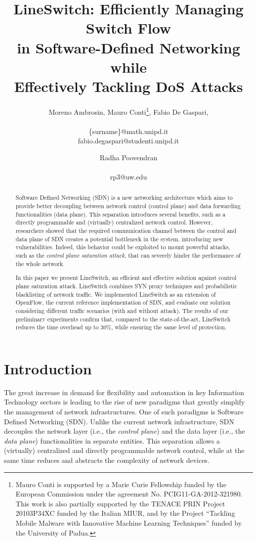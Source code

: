 \documentclass{sig-alternate}
\author{
	Moreno Ambrosin, Mauro Conti\thanks{\scriptsize Mauro Conti is supported by a Marie Curie Fellowship funded by the European Commission under the agreement No. PCIG11-GA-2012-321980. This work is also partially supported by the TENACE PRIN Project 20103P34XC funded by the Italian MIUR, and by the Project ``Tackling Mobile Malware with Innovative Machine Learning Techniques'' funded by the University of Padua.}, Fabio De Gaspari,\\
	\affaddr{University of Padua, Italy}\\
	{\{surname\}@math.unipd.it}\\
	{fabio.degaspari@studenti.unipd.it}
	\and
	Radha Poovendran\\
	\affaddr{University of Washington, USA}\\
	{rp3@uw.edu}	
}
\begin{document}
\title{LineSwitch: Efficiently Managing Switch Flow \\in Software-Defined Networking while \\Effectively Tackling DoS Attacks}


\maketitle


\begin{abstract}

Software Defined Networking (SDN) is a new networking architecture which aims to provide better decoupling between network control (control plane) 
and data forwarding functionalities (data plane). 
This separation introduces several benefits, such as a directly programmable and (virtually) centralized network control. 
However, researchers showed that the required communication channel between the control and data plane of SDN 
creates a potential bottleneck in the system, introducing new vulnerabilities.
Indeed, this behavior could be exploited to mount powerful attacks,
such as the {\em control plane saturation attack}, that can severely hinder the performance of the whole network.

In this paper we present LineSwitch, an efficient and effective solution against control plane saturation attack. 
LineSwitch combines SYN proxy techniques and probabilistic blacklisting of network traffic. 
We implemented LineSwitch as an extension of OpenFlow, the current reference implementation of SDN, 
and evaluate our solution considering different traffic scenarios (with and without attack).
The results of our preliminary experiments confirm that, compared to the state-of-the-art, LineSwitch reduces the time overhead up to 30\%, while ensuring the same level of protection.

\end{abstract}




\section{Introduction}
\sloppy
The great increase in demand for flexibility and automation in key Information Technology sectors is leading to the rise of new paradigms that greatly simplify the management of network infrastructures. 
One of such paradigms is Software Defined Networking (SDN). Unlike the current network infrastructure, SDN decouples the network layer (i.e., the {\em control plane}) and the data layer (i.e., the {\em data plane}) functionalities in separate entities. This separation allows a (virtually) centralized and directly programmable network control, while at the same time reduces and abstracts the complexity of network devices. 
\end{document}
